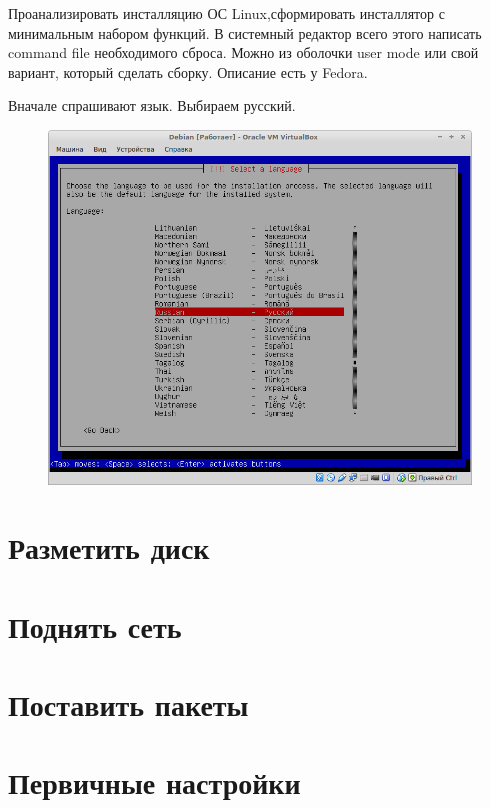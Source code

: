 \documentclass[12pt,a4paper]{article}
\begin{document}
\newpage
\tableofcontents
\newpage
Проанализировать инсталляцию ОС Linux,сформировать инсталлятор с минимальным набором функций. В системный редактор всего этого написать command file необходимого сброса. Можно  из оболочки user mode или свой вариант, который сделать сборку. Описание есть у  Fedora.

Вначале спрашивают язык. Выбираем русский.
\begin{figure}[h!]
\centering
\includegraphics[scale=0.45]{res/russian}
\end{figure}
\section{Разметить диск}
\section{Поднять сеть}
\section{Поставить пакеты}
\section{Первичные настройки}
\end{document}
